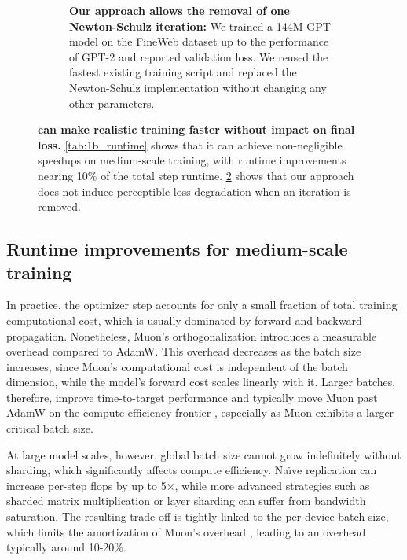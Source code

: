\begin{figure}[t]
\begin{subfigure}[b]{0.49\textwidth}
\begin{tabular}{llll}
        \bottomrule
        \end{tabular}
        \vspace{6mm}
        \caption{\textbf{Our approach allows the removal of one Newton-Schulz iteration:} We trained a 144M GPT model on the FineWeb dataset\cite{penedo2024fineweb} up to the performance of GPT-2 and reported validation loss. We reused the fastest existing training script and replaced the Newton-Schulz implementation without changing any other parameters. %
        }
        \label{tab:nanoGPT_accuracy}
        \vspace{3.5mm}
    \end{subfigure}
    \caption{\textbf{\turbomuon can make realistic training faster without impact on final loss.} \cref{tab:1b_runtime} shows that it can achieve non-negligible speedups on medium-scale training, with runtime improvements nearing 10\% of the total step runtime. \cref{tab:nanoGPT_accuracy} shows that our approach does not induce perceptible loss degradation when an iteration is removed.}
\end{figure}

\begin{figure}[t]
    \centering
\end{figure}

\subsection{Runtime improvements for medium-scale training}
In practice, the optimizer step accounts for only a small fraction of total training computational cost, which is usually dominated by forward and backward propagation. Nonetheless, Muon’s orthogonalization introduces a measurable overhead compared to AdamW. This overhead decreases as the batch size increases, since Muon’s computational cost is independent of the batch dimension, while the model’s forward cost scales linearly with it. Larger batches, therefore, improve time-to-target performance and typically move Muon past AdamW on the compute-efficiency frontier \cite{shah2025practical}, especially as Muon exhibits a larger critical batch size\cite{wen_fantastic_2025}.

At large model scales, however, global batch size cannot grow indefinitely without sharding, which significantly affects compute efficiency. Naïve replication can increase per-step flops by up to 5×, while more advanced strategies such as sharded matrix multiplication or layer sharding can suffer from bandwidth saturation. The resulting trade-off is tightly linked to the per-device batch size, which limits the amortization of Muon’s overhead \cite{essential2025muon}, leading to an overhead typically around 10-20\%.

